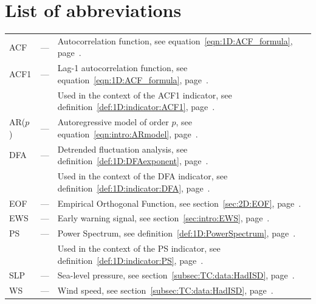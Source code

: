 \documentclass[a4paper,12pt,times,custombib, print]{PhDThesisPSnPDF}
\begin{document}
\chapter{List of abbreviations}
\begin{center}
	\begin{tabular}{ l c l  }
		ACF & — & Autocorrelation function, see equation~\ref{eqn:1D:ACF_formula}, page~\pageref{eqn:1D:ACF_formula}. \\
		ACF1 & — & Lag-1 autocorrelation function, see equation~\ref{eqn:1D:ACF_formula}, page~\pageref{eqn:1D:ACF_formula}. \\
		& & Used in the context of the ACF1 indicator, see definition~\ref{def:1D:indicator:ACF1}, page~\pageref{def:1D:indicator:ACF1}.\\ 
		AR($p$) & — & Autoregressive model of order $p$, see equation~\ref{eqn:intro:ARmodel}, page~\pageref{eqn:intro:ARmodel}.\\
		DFA & — & Detrended fluctuation analysis, see definition~\ref{def:1D:DFAexponent}, page~\pageref{def:1D:DFAexponent}.\\
		& & Used in the context of the DFA indicator, see definition~\ref{def:1D:indicator:DFA}, page~\pageref{def:1D:indicator:DFA}.\\
		EOF & — & Empirical Orthogonal Function, see section~\ref{sec:2D:EOF}, page~\pageref{sec:2D:EOF}. \\
		EWS & — & Early warning signal, see section~\ref{sec:intro:EWS}, page~\pageref{sec:intro:EWS}.\\
		PS & — & Power Spectrum, see definition~\ref{def:1D:PowerSpectrum}, page~\pageref{def:1D:PSexponent}.\\
		& & Used in the context of the PS indicator, see definition~\ref{def:1D:indicator:PS}, page~\pageref{def:1D:indicator:PS}.\\
    	SLP & — & Sea-level pressure, see section~\ref{subsec:TC:data:HadISD}, page~\pageref{subsec:TC:data:HadISD}.\\
    	WS & — & Wind speed, see section~\ref{subsec:TC:data:HadISD}, page~\pageref{subsec:TC:data:HadISD}.
    \end{tabular}
\end{center}


\listoffigures
\listoftables

\end{document}
